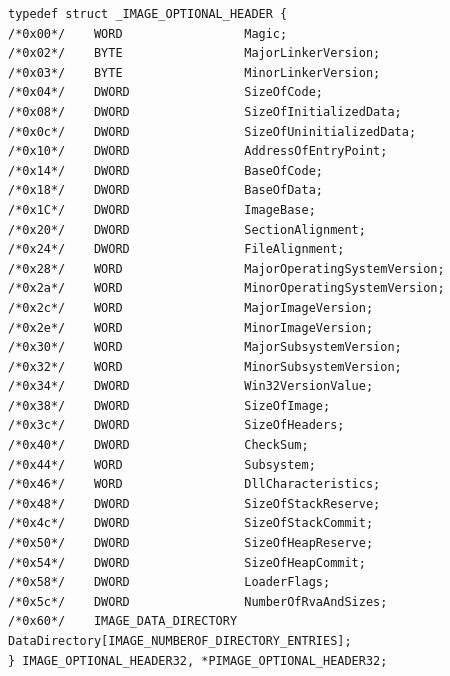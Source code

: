\begin{verbatim}
typedef struct _IMAGE_OPTIONAL_HEADER {
/*0x00*/    WORD                 Magic;
/*0x02*/    BYTE                 MajorLinkerVersion;
/*0x03*/    BYTE                 MinorLinkerVersion;
/*0x04*/    DWORD                SizeOfCode;
/*0x08*/    DWORD                SizeOfInitializedData;
/*0x0c*/    DWORD                SizeOfUninitializedData;
/*0x10*/    DWORD                AddressOfEntryPoint;
/*0x14*/    DWORD                BaseOfCode;
/*0x18*/    DWORD                BaseOfData;
/*0x1C*/    DWORD                ImageBase;
/*0x20*/    DWORD                SectionAlignment;
/*0x24*/    DWORD                FileAlignment;
/*0x28*/    WORD                 MajorOperatingSystemVersion;
/*0x2a*/    WORD                 MinorOperatingSystemVersion;
/*0x2c*/    WORD                 MajorImageVersion;
/*0x2e*/    WORD                 MinorImageVersion;
/*0x30*/    WORD                 MajorSubsystemVersion;
/*0x32*/    WORD                 MinorSubsystemVersion;
/*0x34*/    DWORD                Win32VersionValue;
/*0x38*/    DWORD                SizeOfImage;
/*0x3c*/    DWORD                SizeOfHeaders;
/*0x40*/    DWORD                CheckSum;
/*0x44*/    WORD                 Subsystem;
/*0x46*/    WORD                 DllCharacteristics;
/*0x48*/    DWORD                SizeOfStackReserve;
/*0x4c*/    DWORD                SizeOfStackCommit;
/*0x50*/    DWORD                SizeOfHeapReserve;
/*0x54*/    DWORD                SizeOfHeapCommit;
/*0x58*/    DWORD                LoaderFlags;
/*0x5c*/    DWORD                NumberOfRvaAndSizes;
/*0x60*/    IMAGE_DATA_DIRECTORY DataDirectory[IMAGE_NUMBEROF_DIRECTORY_ENTRIES];
} IMAGE_OPTIONAL_HEADER32, *PIMAGE_OPTIONAL_HEADER32;
\end{verbatim}

